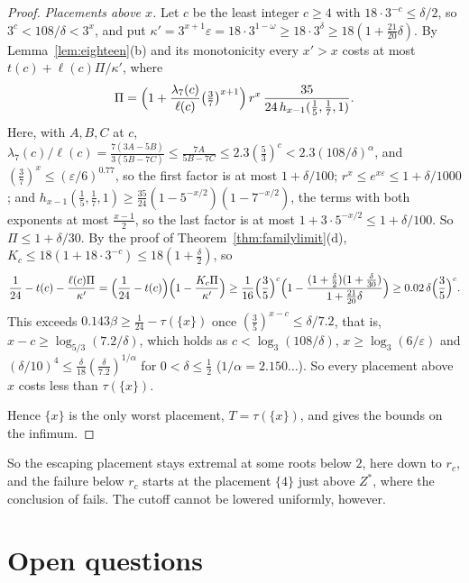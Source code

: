 \documentclass[11pt]{article}
\begin{document}
\begin{proof}
\emph{Placements above $x$.}  Let $c$ be the least integer $c\ge4$ with
$18\cdot3^{-c}\le\delta/2$, so $3^c<108/\delta<3^x$, and put
$\kappa'=3^{x+1}\varepsilon=18\cdot3^{1-\omega}\ge18\cdot3^\delta\ge18(1+\tfrac{21}{20}\delta)$.
By Lemma~\ref{lem:eighteen}(b) and its monotonicity every $x'>x$ costs at
most $t(c)+\ell(c)\Pi/\kappa'$, where
\[
  \Pi=\Bigl(1+\frac{\lambda_7(c)}{\ell(c)}\bigl(\tfrac37\bigr)^{x+1}\Bigr)\,
  r^x\,\frac{35}{24\,h_{x-1}(\tfrac15,\tfrac17,1)} .
\]
Here, with $A,B,C$ at $c$, $\lambda_7(c)/\ell(c)=\tfrac{7(3A-5B)}{3(5B-7C)}\le\tfrac{7A}{5B-7C}\le2.3(\tfrac53)^c
<2.3(108/\delta)^\alpha$, and $(\tfrac37)^x\le(\varepsilon/6)^{0.77}$,
so the first factor is at most $1+\delta/100$; $r^x\le e^{x\varepsilon}\le1+\delta/1000$;
and $h_{x-1}(\tfrac15,\tfrac17,1)\ge\tfrac{35}{24}(1-5^{-x/2})(1-7^{-x/2})$,
the terms with both exponents at most $\tfrac{x-1}2$, so the last factor is
at most $1+3\cdot5^{-x/2}\le1+\delta/100$.  So $\Pi\le1+\delta/30$.  By the
proof of Theorem~\ref{thm:familylimit}(d), $K_c\le18(1+18\cdot3^{-c})\le18(1+\tfrac\delta2)$,
so
\[
  \frac1{24}-t(c)-\frac{\ell(c)\Pi}{\kappa'}
  =\Bigl(\frac1{24}-t(c)\Bigr)\Bigl(1-\frac{K_c\Pi}{\kappa'}\Bigr)
  \ge\frac1{16}\Bigl(\frac35\Bigr)^c\Bigl(1-\frac{(1+\tfrac\delta2)(1+\tfrac\delta{30})}{1+\tfrac{21}{20}\delta}\Bigr)
  \ge0.02\,\delta\Bigl(\frac35\Bigr)^c .
\]
This exceeds $0.143\beta\ge\tfrac1{24}-\tau(\{x\})$ once
$(\tfrac35)^{x-c}\le\delta/7.2$, that is, $x-c\ge\log_{5/3}(7.2/\delta)$,
which holds as $c<\log_3(108/\delta)$, $x\ge\log_3(6/\varepsilon)$ and
$(\delta/10)^4\le\tfrac\delta{18}(\tfrac\delta{7.2})^{1/\alpha}$ for
$0<\delta\le\tfrac12$ ($1/\alpha=2.150\ldots$).  So every placement above
$x$ costs less than $\tau(\{x\})$.

Hence $\{x\}$ is the only worst placement, $T=\tau(\{x\})$, and
\cite[Theorem~3.1]{coefficient-mass-attainment} gives the bounds on the infimum.
\end{proof}

So the escaping placement stays extremal at some roots below $2$, here down
to $r_c$, and the failure below $r_c$ starts at the placement $\{4\}$ just
above $Z^*$, where the conclusion of \cite[Lemma~4.1]{coefficient-mass-attainment} fails.  The cutoff cannot be
lowered uniformly, however.

\section{Open questions}\label{sec:familyopen}
\end{document}
